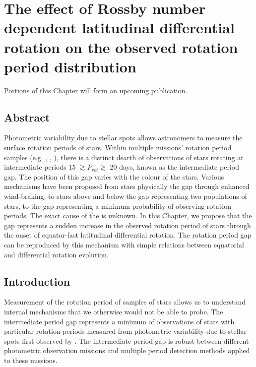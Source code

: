 \chapter{The effect of Rossby number dependent latitudinal differential rotation on the observed rotation period distribution}
\label{chap:period_gap}

Portions of this Chapter will form an upcoming publication.

\section*{Abstract}

Photometric variability due to stellar spots allows astronomers to measure the surface rotation periods of stars.
Within multiple missions' rotation period samples (e.g. \kepler, \ktoo, \ZTF), there is a distinct dearth of observations of stars rotating at intermediate periods 15 $\gtrsim P_{rot} \gtrsim$ 20 days, known as the intermediate period gap.
The position of this gap varies with the colour of the stars.
Various mechanisms have been proposed from stars physically  the gap through enhanced wind-braking, to stars above and below the gap representing two populations of stars, to the gap representing a minimum probability of observing rotation periods.
The exact cause of the  is unknown.
In this Chapter, we propose that the gap represents a sudden increase in the observed rotation period of stars through the onset of equator-fast latitudinal differential rotation.
The rotation period gap can be reproduced by this mechanism with simple relations between equatorial and differential rotation evolution.

\newpage

\section{Introduction}
\label{sec:intro}

Measurement of the rotation period of samples of stars allows us to understand internal mechanisms that we otherwise would not be able to probe.
The intermediate period gap represents a minimum of observations of stars with particular rotation periods measured from photometric variability due to stellar spots first observed by \citet{mcquillan_rotation_2014}.
The intermediate period gap is robust between different photometric observation missions \citep{mcquillan_rotation_2014,davenport_rotating_2017,davenport_rotating_2018,lu_bridging_2022} and multiple period detection methods applied to these missions.

